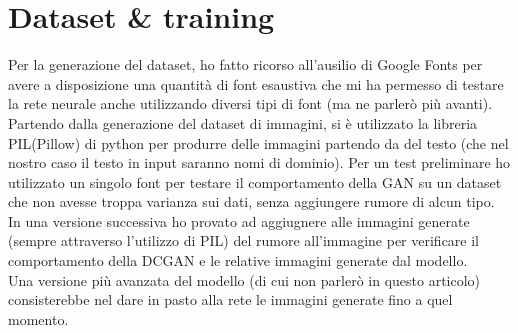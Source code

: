 \section{Dataset \& training}
Per la generazione del dataset, ho fatto ricorso all'ausilio di Google Fonts per avere a disposizione una quantità di font esaustiva che mi ha permesso di testare la rete neurale anche utilizzando diversi tipi di font (ma ne parlerò più avanti).
Partendo dalla generazione del dataset di immagini, si è utilizzato la libreria PIL(Pillow) di python per produrre delle immagini partendo da del testo (che nel nostro caso il testo in input saranno nomi di dominio). Per un test preliminare ho utilizzato un singolo font per testare il comportamento della GAN su un dataset che non avesse troppa varianza sui dati, senza aggiungere rumore di alcun tipo.\\
In una versione successiva ho provato ad aggiugnere alle immagini generate (sempre attraverso l'utilizzo di PIL) del rumore all'immagine per verificare il comportamento della DCGAN e le relative immagini generate dal modello.\\
Una versione più avanzata del modello (di cui non parlerò in questo articolo) consisterebbe nel dare in pasto alla rete le immagini generate fino a quel momento.%
